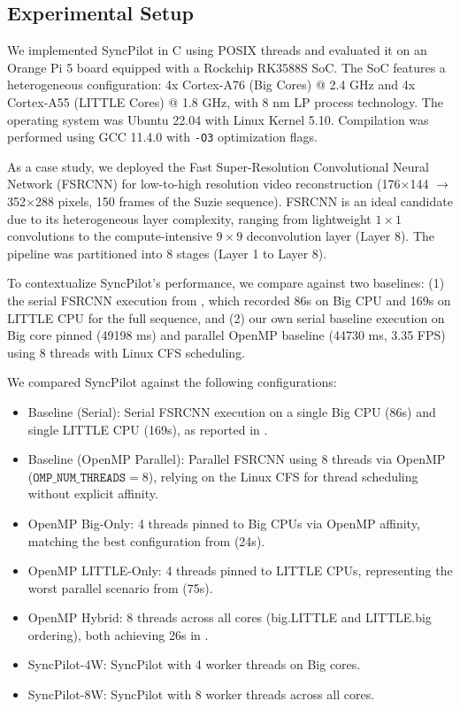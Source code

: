 \documentclass[conference]{IEEEtran}
\begin{document}
\subsection{Experimental Setup}
We implemented SyncPilot in C using POSIX threads and evaluated it on an Orange Pi 5 board equipped with a Rockchip RK3588S SoC. The SoC features a heterogeneous configuration: 4x Cortex-A76 (Big Cores) @ 2.4 GHz and 4x Cortex-A55 (LITTLE Cores) @ 1.8 GHz, with 8 nm LP process technology. The operating system was Ubuntu 22.04 with Linux Kernel 5.10. Compilation was performed using GCC 11.4.0 with \texttt{-O3} optimization flags.

As a case study, we deployed the Fast Super-Resolution Convolutional Neural Network (FSRCNN) \cite{dong2016fsrcnn} for low-to-high resolution video reconstruction (176$\times$144 $\rightarrow$ 352$\times$288 pixels, 150 frames of the Suzie sequence). FSRCNN is an ideal candidate due to its heterogeneous layer complexity, ranging from lightweight $1\times1$ convolutions to the compute-intensive $9\times9$ deconvolution layer (Layer 8). The pipeline was partitioned into 8 stages (Layer 1 to Layer 8).

To contextualize SyncPilot's performance, we compare against two baselines: (1) the serial FSRCNN execution from \cite{annisa2025fsrcnn}, which recorded 86s on Big CPU and 169s on LITTLE CPU for the full sequence, and (2) our own serial baseline execution on Big core pinned (49198 ms) and parallel OpenMP baseline (44730 ms, 3.35 FPS) using 8 threads with Linux CFS scheduling.

We compared SyncPilot against the following configurations:
\begin{itemize}
    \item Baseline (Serial): Serial FSRCNN execution on a single Big CPU (86s) and single LITTLE CPU (169s), as reported in \cite{annisa2025fsrcnn}.
    \item Baseline (OpenMP Parallel): Parallel FSRCNN using 8 threads via OpenMP ($\texttt{OMP\_NUM\_THREADS}=8$), relying on the Linux CFS for thread scheduling without explicit affinity.
    \item OpenMP Big-Only: 4 threads pinned to Big CPUs via OpenMP affinity, matching the best configuration from \cite{annisa2025fsrcnn} (24s).
    \item OpenMP LITTLE-Only: 4 threads pinned to LITTLE CPUs, representing the worst parallel scenario from \cite{annisa2025fsrcnn} (75s).
    \item OpenMP Hybrid: 8 threads across all cores (big.LITTLE and LITTLE.big ordering), both achieving 26s in \cite{annisa2025fsrcnn}.
    \item SyncPilot-4W: SyncPilot with 4 worker threads on Big cores.
    \item SyncPilot-8W: SyncPilot with 8 worker threads across all cores.
\end{itemize}
\end{document}
